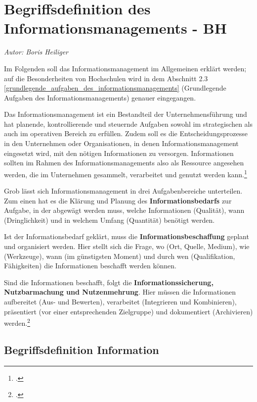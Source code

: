 \section{Begriffsdefinition des Informationsmanagements - BH}
\label{begriffsdefinition_inm}
\textit{Autor: Boris Heiliger}


Im Folgenden soll das Informationsmanagement im Allgemeinen erklärt werden; auf die Besonderheiten von Hochschulen wird in dem Abschnitt 2.3 \ref{grundlegende_aufgaben_des_informationsmanagements} (Grundlegende Aufgaben des Informationsmanagements) genauer eingegangen.

Das Informationsmanagement ist ein Bestandteil der Unternehmensführung und hat planende, kontrollierende und steuernde Aufgaben sowohl im strategischen als auch im operativen Bereich zu erfüllen. Zudem soll es die Entscheidungsprozesse in den Unternehmen oder Organisationen, in denen Informationsmanagement eingesetzt wird, mit den nötigen Informationen zu versorgen. Informationen sollten im Rahmen des Informationsmanagements also als Ressource angesehen werden, die im Unternehmen gesammelt, verarbeitet und genutzt werden kann.\footcite[65-68]{voss_informationsmanagement_2001}

Grob lässt sich Informationsmanagement in drei Aufgabenbereiche unterteilen. Zum einen hat es die Klärung und Planung des \textbf{Informationsbedarfs} zur Aufgabe, in der abgewägt werden muss, welche Informationen (Qualität), wann (Dringlichkeit) und in welchem Umfang (Quantität) benötigt werden.

Ist der Informationsbedarf geklärt, muss die \textbf{Informationsbeschaffung} geplant 
und organisiert werden. Hier stellt sich die Frage, wo (Ort, Quelle, Medium), wie (Werkzeuge), wann (im günstigsten Moment) und durch wen (Qualifikation, Fähigkeiten) die Informationen beschafft werden können.

Sind die Informationen beschafft, folgt die \textbf{Informationssicherung, Nutzbarmachung und Nutzenmehrung}. Hier müssen die Informationen aufbereitet (Aus- und Bewerten), verarbeitet (Integrieren und Kombinieren), präsentiert (vor einer entsprechenden Zielgruppe) und dokumentiert (Archivieren) werden.\footcite{luepke_informationsmanagement_was_2012}

\subsection{Begriffsdefinition Information}

